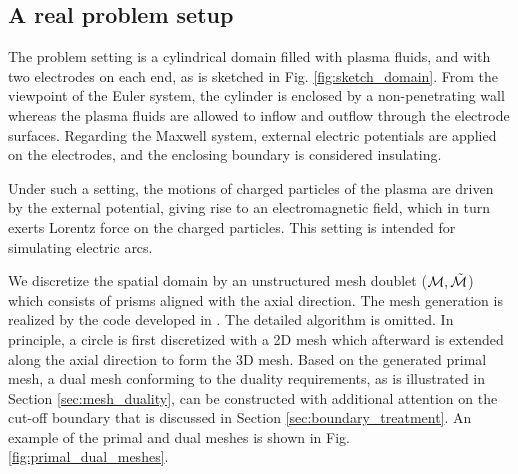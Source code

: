 \documentclass{article}
\begin{document}
\subsection{A real problem setup}
The problem setting is a cylindrical domain filled with plasma fluids, and with two electrodes on each end, as is sketched in Fig. \ref{fig:sketch_domain}. From the viewpoint of the Euler system, the cylinder is enclosed by a non-penetrating wall whereas the plasma fluids are allowed to inflow and outflow through the electrode surfaces. Regarding the Maxwell system, external electric potentials are applied on the electrodes, and the enclosing boundary is considered insulating. 

Under such a setting, the motions of charged particles of the plasma are driven by the external potential, giving rise to an electromagnetic field, which in turn exerts Lorentz force on the charged particles. This setting is intended for simulating electric arcs.

We discretize the spatial domain by an unstructured mesh doublet ($\mathcal{M}, \Tilde{\mathcal{M}}$) which consists of prisms aligned with the axial direction. The mesh generation is realized by the code developed in \cite{fuchs_2021}. The detailed algorithm is omitted. In principle, a circle is first discretized with a 2D mesh which afterward is extended along the axial direction to form the 3D mesh. Based on the generated primal mesh, a dual mesh conforming to the duality requirements, as is illustrated in Section \ref{sec:mesh_duality}, can be constructed with additional attention on the cut-off boundary that is discussed in Section \ref{sec:boundary_treatment}. An example of the primal and dual meshes is shown in Fig. \ref{fig:primal_dual_meshes}.
\end{document}
